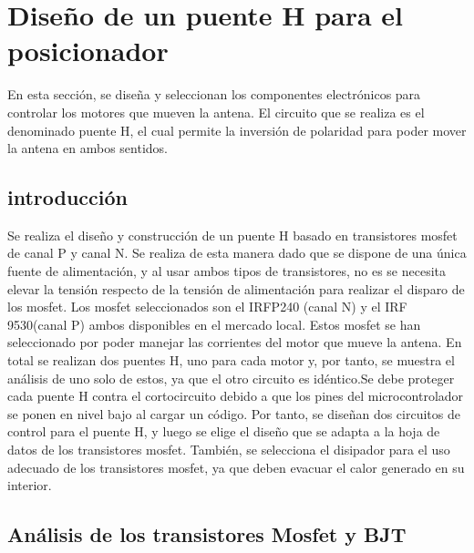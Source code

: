\renewcommand{\chaptername}{Diseño de un puente H para el posicionador}
\graphicspath{{parte_4/puente_h/}}
\chapter{Diseño de un puente H para el posicionador} \label{cap:driver_motores}
\begin{center}
	\begin{tcolorbox}[colback=gray!5!white, %
		colframe=blue!75!black,
		title= \center{\Large{Resumen}} ]
		En esta sección, se diseña y seleccionan los componentes electrónicos para controlar los motores que mueven la antena. El circuito que se realiza es el denominado puente H, el cual permite la inversión de polaridad para poder mover la antena en ambos sentidos. 
	\end{tcolorbox}
\end{center}    


\section{introducción}
	
	Se realiza el diseño y construcción de un puente H basado en transistores mosfet de canal P y canal N. Se realiza de esta manera dado que se dispone de una única fuente de alimentación, y al usar ambos tipos de transistores, no es se necesita elevar la tensión respecto de la tensión de alimentación para realizar el disparo de los mosfet. Los mosfet seleccionados son el IRFP240 (canal N) y el IRF 9530(canal P) ambos disponibles en el mercado local. Estos mosfet se han seleccionado por poder manejar las corrientes del motor que mueve la antena. En total se realizan dos puentes H, uno para cada motor y, por tanto, se muestra el análisis de uno solo de estos, ya que el otro circuito es idéntico.Se debe proteger cada puente H contra el cortocircuito debido a que los pines del microcontrolador se ponen en nivel bajo al cargar un código. Por tanto, se diseñan dos circuitos de control para el puente H, y luego se elige el diseño que se adapta a la hoja de datos de los transistores mosfet. También, se selecciona el disipador para el uso adecuado de los transistores mosfet, ya que deben evacuar el calor generado en su interior.  
	
	
\section{Análisis de los transistores Mosfet y BJT} 

